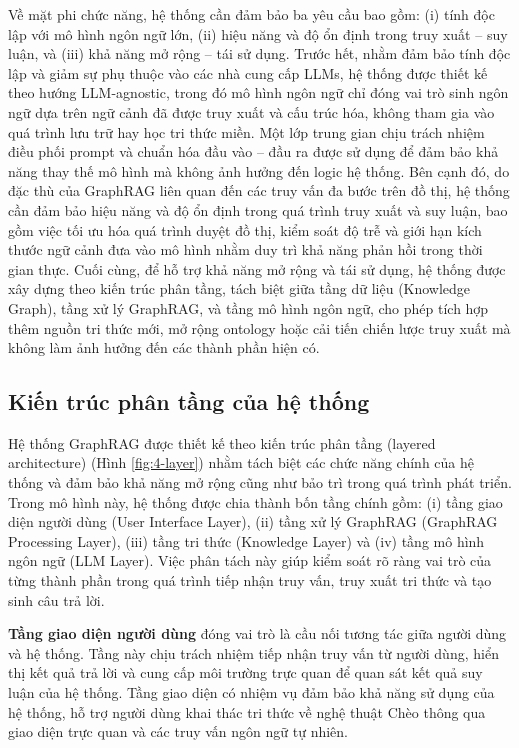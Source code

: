 Về mặt phi chức năng, hệ thống cần đảm bảo ba yêu cầu bao gồm: (i) tính độc lập với mô hình ngôn ngữ lớn, (ii) hiệu năng và độ ổn định trong truy xuất – suy luận, và (iii) khả năng mở rộng – tái sử dụng. Trước hết, nhằm đảm bảo tính độc lập và giảm sự phụ thuộc vào các nhà cung cấp LLMs, hệ thống được thiết kế theo hướng LLM-agnostic, trong đó mô hình ngôn ngữ chỉ đóng vai trò sinh ngôn ngữ dựa trên ngữ cảnh đã được truy xuất và cấu trúc hóa, không tham gia vào quá trình lưu trữ hay học tri thức miền. Một lớp trung gian chịu trách nhiệm điều phối prompt và chuẩn hóa đầu vào – đầu ra được sử dụng để đảm bảo khả năng thay thế mô hình mà không ảnh hưởng đến logic hệ thống. Bên cạnh đó, do đặc thù của GraphRAG liên quan đến các truy vấn đa bước trên đồ thị, hệ thống cần đảm bảo hiệu năng và độ ổn định trong quá trình truy xuất và suy luận, bao gồm việc tối ưu hóa quá trình duyệt đồ thị, kiểm soát độ trễ và giới hạn kích thước ngữ cảnh đưa vào mô hình nhằm duy trì khả năng phản hồi trong thời gian thực. Cuối cùng, để hỗ trợ khả năng mở rộng và tái sử dụng, hệ thống được xây dựng theo kiến trúc phân tầng, tách biệt giữa tầng dữ liệu (Knowledge Graph), tầng xử lý GraphRAG, và tầng mô hình ngôn ngữ, cho phép tích hợp thêm nguồn tri thức mới, mở rộng ontology hoặc cải tiến chiến lược truy xuất mà không làm ảnh hưởng đến các thành phần hiện có.

\subsection{Kiến trúc phân tầng của hệ thống}
Hệ thống GraphRAG được thiết kế theo kiến trúc phân tầng (layered architecture) (Hình \ref{fig:4-layer}) nhằm tách biệt các chức năng chính của hệ thống và đảm bảo khả năng mở rộng cũng như bảo trì trong quá trình phát triển. Trong mô hình này, hệ thống được chia thành bốn tầng chính gồm: (i) tầng giao diện người dùng (User Interface Layer), (ii) tầng xử lý GraphRAG (GraphRAG Processing Layer), (iii) tầng tri thức (Knowledge Layer) và (iv) tầng mô hình ngôn ngữ (LLM Layer). Việc phân tách này giúp kiểm soát rõ ràng vai trò của từng thành phần trong quá trình tiếp nhận truy vấn, truy xuất tri thức và tạo sinh câu trả lời.

\textbf{Tầng giao diện người dùng} đóng vai trò là cầu nối tương tác giữa người dùng và hệ thống. Tầng này chịu trách nhiệm tiếp nhận truy vấn từ người dùng, hiển thị kết quả trả lời và cung cấp môi trường trực quan để quan sát kết quả suy luận của hệ thống. Tầng giao diện có nhiệm vụ đảm bảo khả năng sử dụng của hệ thống, hỗ trợ người dùng khai thác tri thức về nghệ thuật Chèo thông qua giao diện trực quan và các truy vấn ngôn ngữ tự nhiên.

